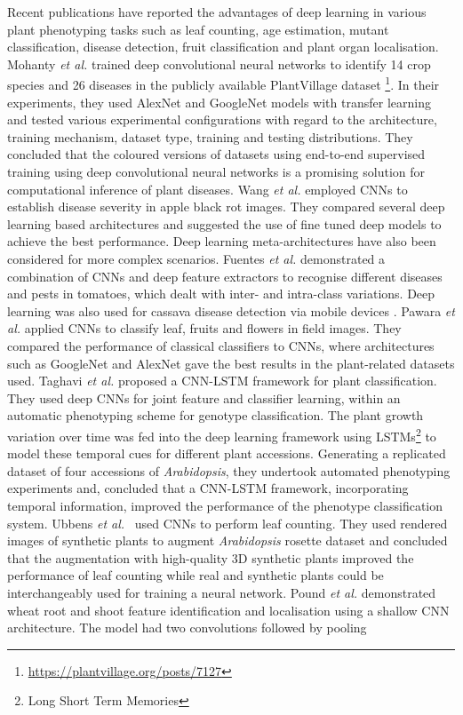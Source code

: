 \documentclass[a4paper,num-refs]{oup-contemporary}
\begin{document}
Recent publications have reported the advantages of deep learning in various plant phenotyping tasks such as leaf counting, age estimation, mutant classification, disease detection, fruit classification and plant organ localisation\cite{mohanty2016using,wang2017automatic,fuentes2017robust,ramcharan2017transfer,pawara2017comparing,namin2017deep,ubbens2018use,pound2016deep}. 
Mohanty \textit{et al.} \cite{mohanty2016using} trained deep convolutional neural networks  to identify 14 crop species and 26 diseases in the publicly available PlantVillage dataset \footnote{\url{https://plantvillage.org/posts/7127}}. In their experiments, they used AlexNet \cite{krizhevsky2012imagenet} and GoogleNet \cite{szegedy2015going} models with transfer learning and tested various experimental configurations with regard to the architecture, training mechanism, dataset type, training and testing distributions. They concluded that the coloured versions of datasets using end-to-end supervised training using deep convolutional neural networks is a promising solution for computational inference of plant diseases. Wang \textit{et al.} \cite{wang2017automatic} employed CNNs to establish disease severity in apple black rot images. They compared several deep learning based architectures and suggested the use of fine tuned deep models to achieve the best performance. Deep learning meta-architectures have also been considered for more complex scenarios. Fuentes \textit{et al.} \cite{fuentes2017robust} demonstrated a combination of CNNs and deep feature extractors to recognise different diseases and pests in tomatoes, which dealt with inter- and intra-class variations. Deep learning was also used for cassava disease detection via mobile devices \cite{ramcharan2017transfer}. Pawara \textit{et al.} \cite{pawara2017comparing} applied CNNs to classify leaf, fruits and flowers in field images. They compared the performance of classical classifiers to CNNs, where architectures such as GoogleNet and AlexNet gave the best results in the plant-related datasets used. Taghavi \textit{et al.} \cite{namin2017deep}  proposed a CNN-LSTM framework for plant classification. They used deep CNNs for joint feature and classifier learning, within an automatic phenotyping scheme for genotype classification. The plant growth variation over time was fed into the deep learning framework using LSTMs\footnote{Long Short Term Memories} to model these temporal cues for different plant accessions. Generating a replicated dataset of four accessions of \textit{Arabidopsis}, they undertook automated phenotyping experiments and, concluded that a CNN-LSTM framework, incorporating temporal information, improved the performance of the phenotype classification system. Ubbens \textit{et al.}~\cite{ubbens2018use} used CNNs to perform leaf counting. They used rendered images of synthetic plants to augment \textit{Arabidopsis} rosette dataset and concluded that the augmentation with high-quality 3D synthetic plants improved the performance of leaf counting while real and synthetic plants could be interchangeably used for training a neural network. Pound \textit{et al.} \cite{pound2016deep} demonstrated wheat root and shoot feature identification and localisation using a shallow CNN architecture. The model had two convolutions followed by pooling 
\end{document}
